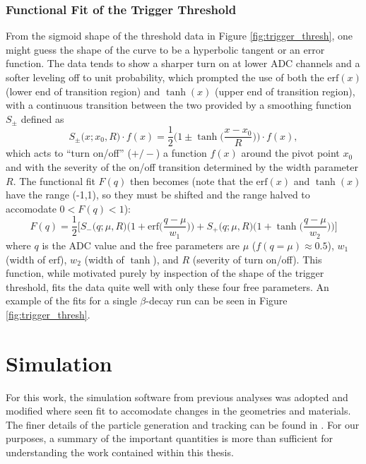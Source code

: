 \subsubsection{Functional Fit of the Trigger Threshold}
From the sigmoid shape of the threshold data in Figure \ref{fig:trigger_thresh}, one might guess
the shape of the curve to be a hyperbolic tangent or an error function. The data tends to show
a sharper turn on at lower ADC channels and a softer leveling off to unit probability, which
prompted the use of both the $\mathrm{erf}(x)$ (lower end of transition region)
and $\tanh(x)$ (upper end of transition region),
with a continuous transition between the
two provided by a smoothing function $S_\pm$ defined as
%
\begin{equation}
  S_\pm\big(x;x_0,R\big) \cdot f(x) = \frac{1}{2}\bigg(1\pm\tanh\Big(\frac{x-x_0}{R}\Big)\bigg) \cdot f(x),
\end{equation}
%
which acts to ``turn on/off'' ($+/-$) a function $f(x)$ around the pivot point $x_0$ and with the severity of
the on/off transition determined by the width parameter $R$. The functional fit $F(q)$ then becomes (note that the $\mathrm{erf}(x)$ and $\tanh(x)$ 
have the range (-1,1), so they must be shifted and the range halved to accomodate $0<F(q)<1$):
%
\begin{equation}
  F(q) = \frac{1}{2} \Bigg[ S_-\big(q;\mu,R\big) \bigg(1 + \mathrm{erf}\Big(\frac{q-\mu}{w_1}\Big)\bigg) +
  S_+\big(q;\mu,R\big) \bigg(1+\tanh\Big(\frac{q-\mu}{w_2}\Big)\bigg)\Bigg]
\end{equation}
%
where $q$ is the ADC value and
the free parameters are $\mu$ ($f(q=\mu)\approx 0.5$), $w_1$ (width of $\mathrm{erf}$), $w_2$ (width of $\tanh$), and $R$ (severity of turn on/off).
This function, while motivated purely by inspection of the shape of the trigger threshold, fits the data
quite well with only these four free parameters. An example of the fits for a single $\beta$-decay
run can be seen in Figure \ref{fig:trigger_thresh}. 



\section{Simulation}
\label{sec:Simulation}

For this work, the simulation software from previous analyses was adopted
and modified where seen fit to accomodate changes in the geometries
and materials. The finer details of the particle generation and
tracking can be found in \cite{mpmThesis}. For our purposes, a summary
of the important quantities is more than sufficient for understanding
the work contained within this thesis.

